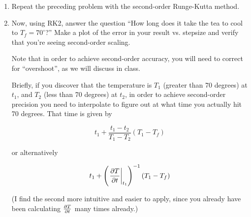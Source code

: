 \documentclass[12pt]{article}
\def\PAR#1#2{ {{\partial #1}\over{\partial #2}} }
\begin{document}
\begin{enumerate}
\item{Repeat the preceding problem with the second-order Runge-Kutta method.}

\item{Now, using RK2, answer the question ``How long does it take the tea to cool to $T_f=70^\circ$?'' Make a plot of the error in your result vs. stepsize and verify that you're seeing second-order scaling. 

Note that in order to achieve second-order accuracy, you will need to correct for ``overshoot'', as we will discuss in class. 

Briefly, if you discover that the temperature is $T_1$ (greater than 70 degrees) at $t_1$, and $T_2$ (less than 70 degrees) at $t_2$, in order to achieve second-order precision you need to interpolate to figure out at what time you actually hit 70 degrees. That time is given by

\begin{equation}
t_1 + \frac{t_1-t_2}{T_1-T_2} (T_1-T_f)
\end{equation}

or alternatively

\begin{equation}
t_1 + \left(\left.\PAR{T}{t}\right|_{t_1}\right)^{-1} (T_1-T_f)
\end{equation}

(I find the second more intuitive and easier to apply, since you already have been calculating $\PAR{T}{t}$ many times already.)

}



\end{enumerate}
\end{document}
